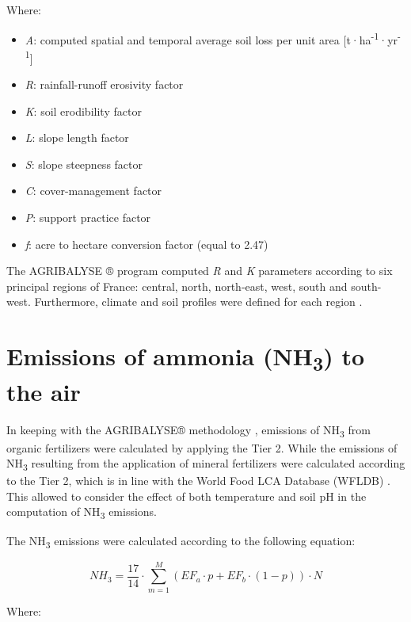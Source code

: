 \documentclass[openany]{book}
\begin{document}
Where:

\begin{itemize}
\item
  \emph{A}: computed spatial and temporal average soil loss per unit area {[}t·ha\textsuperscript{-1}·yr\textsuperscript{-1}{]}
\item
  \emph{R}: rainfall-runoff erosivity factor
\item
  \emph{K}: soil erodibility factor
\item
  \emph{L}: slope length factor
\item
  \emph{S}: slope steepness factor
\item
  \emph{C}: cover-management factor
\item
  \emph{P}: support practice factor
\item
  \emph{f}: acre to hectare conversion factor (equal to 2.47)
\end{itemize}

The AGRIBALYSE ® program computed \emph{R} and \emph{K} parameters according to six principal regions of France: central, north, north-east, west, south and south-west. Furthermore, climate and soil profiles were defined for each region \citep{Koch2015}.

\hypertarget{emissions-of-ammonia-nh3-to-the-air}{%
\section{\texorpdfstring{Emissions of ammonia (NH\textsubscript{3}) to the air}{Emissions of ammonia (NH3) to the air}}\label{emissions-of-ammonia-nh3-to-the-air}}

In keeping with the AGRIBALYSE® methodology \citep{Koch2015}, emissions of NH\textsubscript{3} from organic fertilizers were calculated by applying the \citet{emep-eea2009} Tier 2. While the emissions of NH\textsubscript{3} resulting from the application of mineral fertilizers were calculated according to the \citet{emep-eea2013} Tier 2, which is in line with the World Food LCA Database (WFLDB) \citep{nemecek2014}. This allowed to consider the effect of both temperature and soil pH in the computation of NH\textsubscript{3} emissions.

The NH\textsubscript{3} emissions were calculated according to the following equation:

\[NH_3=\frac{17}{14} \cdot \sum_{m=1}^{M}(EF_a \cdot p + EF_b \cdot (1-p)) \cdot N \]

Where:
\end{document}

